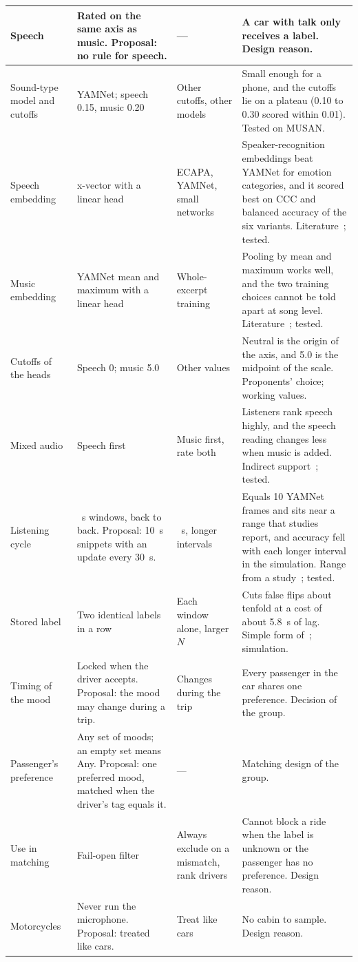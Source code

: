 {\begin{longtable}{|>{\raggedright\arraybackslash}p{}|>{\raggedright\arraybackslash}p{}|>{\raggedright\arraybackslash}p{}|>{\raggedright\arraybackslash}p{}|}
\hline
Speech & Rated on the same axis as music. Proposal: no rule for speech. & --- & A car with talk only receives a label. Design reason. \\
\hline
Sound-type model and cutoffs & YAMNet; speech 0.15, music 0.20 & Other cutoffs, other models & Small enough for a phone, and the cutoffs lie on a plateau (0.10 to 0.30 scored within 0.01). Tested on MUSAN. \\
\hline
Speech embedding & x-vector with a linear head & ECAPA, YAMNet, small networks & Speaker-recognition embeddings beat YAMNet for emotion categories, and it scored best on CCC and balanced accuracy of the six variants. Literature~\cite{phukan2023embeddings}; tested. \\
\hline
Music embedding & YAMNet mean and maximum with a linear head & Whole-excerpt training & Pooling by mean and maximum works well, and the two training choices cannot be told apart at song level. Literature~\cite{koh2021embeddings}; tested. \\
\hline
Cutoffs of the heads & Speech 0; music 5.0 & Other values & Neutral is the origin of the axis, and 5.0 is the midpoint of the scale. Proponents' choice; working values. \\
\hline
Mixed audio & Speech first & Music first, rate both & Listeners rank speech highly, and the speech reading changes less when music is added. Indirect support~\cite{liu2025salience,laugs2020mixed}; tested. \\
\hline
Listening cycle & 5.295~s windows, back to back. Proposal: 10~s snippets with an update every 30~s. & 10~s, longer intervals & Equals 10 YAMNet frames and sits near a range that studies report, and accuracy fell with each longer interval in the simulation. Range from a study~\cite{sun2023segmented}; tested. \\
\hline
Stored label & Two identical labels in a row & Each window alone, larger $N$ & Cuts false flips about tenfold at a cost of about 5.8~s of lag. Simple form of~\cite{cances2019postprocessing}; simulation. \\
\hline
Timing of the mood & Locked when the driver accepts. Proposal: the mood may change during a trip. & Changes during the trip & Every passenger in the car shares one preference. Decision of the group. \\
\hline
Passenger's preference & Any set of moods; an empty set means Any. Proposal: one preferred mood, matched when the driver's tag equals it. & --- & Matching design of the group. \\
\hline
Use in matching & Fail-open filter & Always exclude on a mismatch, rank drivers & Cannot block a ride when the label is unknown or the passenger has no preference. Design reason. \\
\hline
Motorcycles & Never run the microphone. Proposal: treated like cars. & Treat like cars & No cabin to sample. Design reason. \\
\hline
\end{longtable}
}


